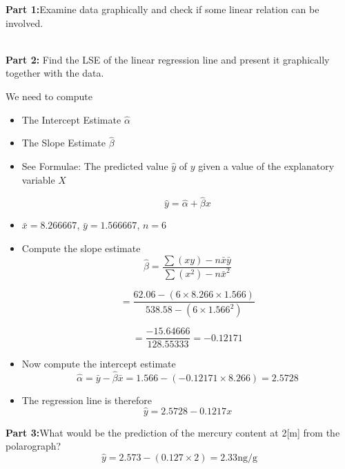 \noindent\textbf{Part 1:}Examine data graphically and check if some linear relation can be involved.

\\
\bigskip
\noindent\textbf{Part 2: }Find the LSE of the linear regression line and present it graphically together with the data.

We need to compute

\begin{itemize}
	
	\item The Intercept Estimate $\hat{\alpha}$
	
	\item The Slope Estimate $\hat{\beta}$
	
	\item See Formulae: The predicted value $\hat{y} $ of $y$ given a value of the explanatory variable $X$
	
	\[\hat{y} = \hat{\alpha} + \hat{\beta}x \]
	
	
	
	\item  $\bar{x} = 8.266667$, $\bar{y} = 1.566667$, $n =6$
	
	\item Compute the slope estimate
	\[\hat{\beta} =  \frac{\sum(xy) - n\bar{x} \bar{y} }{\sum(x^2) - n\bar{x}^2 }\]
	
	\[= \frac{62.06 - (6 \times 8.266 \times 1.566) }{538.58  - (6 \times 1.566^2) }\]
	
	\[= \frac{-15.64666}{128.55333} = -0.12171\]
	
	
	\item Now compute the intercept estimate \[ \hat{\alpha} = \bar{y} - \hat{\beta}\bar{x} = 1.566-(-0.12171 \times 8.266) = 2.5728\]
	\item The regression line is therefore \[\hat{y} = 2.5728 - 0.1217x \]
\end{itemize}




\noindent\textbf{Part 3:}What would be the prediction of the mercury content at 2[m] from the polarograph?
\bigskip
\[ \hat{y} = 2.573 - (0.127 \times 2) = 2.33 \mbox{ng/g}  \]


